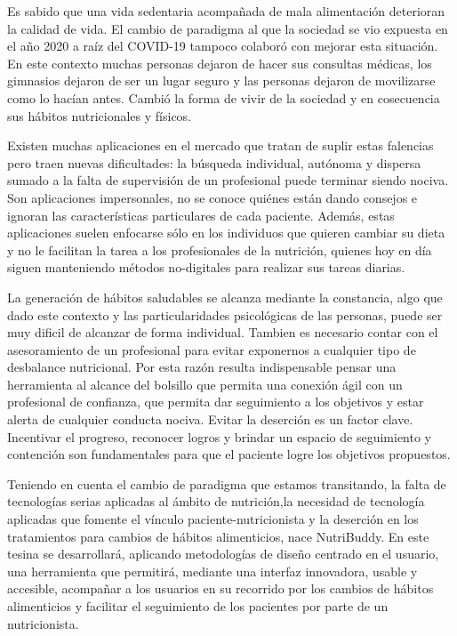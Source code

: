 Es sabido que una vida sedentaria acompañada de mala alimentación deterioran la calidad de vida. El cambio de paradigma al que la sociedad se vio expuesta en el año 2020 a raíz del COVID-19 tampoco colaboró con mejorar esta situación. En este contexto muchas personas dejaron de hacer sus consultas médicas, los gimnasios dejaron de ser un lugar seguro y las personas dejaron de movilizarse como lo hacían antes. Cambió la forma de vivir de la sociedad y en cosecuencia sus hábitos nutricionales y físicos.

Existen muchas aplicaciones en el mercado que tratan de suplir estas falencias pero traen nuevas dificultades: la búsqueda individual, autónoma y dispersa sumado a la falta de supervisión de un profesional puede terminar siendo nociva. Son aplicaciones impersonales, no se conoce quiénes están dando consejos e ignoran las características particulares de cada paciente. Además, estas aplicaciones suelen enfocarse sólo en los individuos que quieren cambiar su dieta y no le facilitan la tarea a los profesionales de la nutrición, quienes hoy en día siguen manteniendo métodos no-digitales para realizar sus tareas diarias.

La generación de hábitos saludables se alcanza mediante la constancia, algo que dado este contexto y las particularidades psicológicas de las personas, puede ser muy dificil de alcanzar de forma individual. Tambien es necesario contar con el asesoramiento de un profesional para evitar exponernos a cualquier tipo de desbalance nutricional. Por esta razón resulta indispensable pensar una herramienta al alcance del bolsillo que permita una conexión ágil con un profesional de confianza, que permita dar seguimiento a los objetivos y estar alerta de cualquier conducta nociva. Evitar la deserción es un factor clave. Incentivar el progreso, reconocer logros y brindar un espacio de seguimiento y contención son fundamentales para que el paciente logre los objetivos propuestos. 

Teniendo en cuenta el cambio de paradigma que estamos transitando, la falta de tecnologías serias aplicadas al ámbito de nutrición,la necesidad de tecnología aplicadas que fomente el vínculo paciente-nutricionista y la deserción en los tratamientos para cambios de hábitos alimenticios, nace NutriBuddy. En este tesina se desarrollará, aplicando metodologías de diseño centrado en el usuario, una herramienta que permitirá, mediante una interfaz innovadora, usable y accesible, acompañar a los usuarios en su recorrido por los cambios de hábitos alimenticios y facilitar el seguimiento de los pacientes por parte de un nutricionista.


\cite{educacionPrimaria2018}